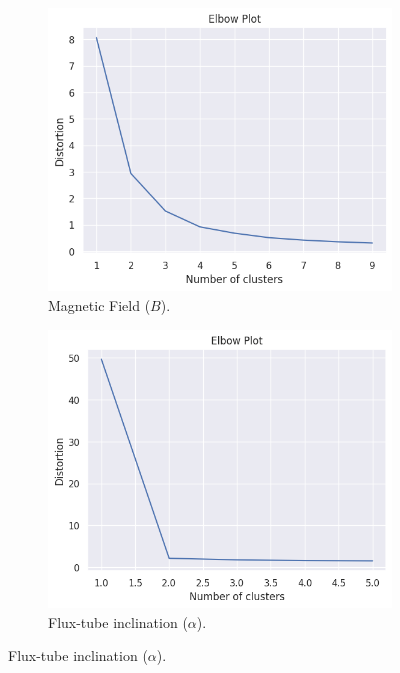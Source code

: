 \begin{figure}[h]
    \caption{TimeSeriesKMeans Elbow Tests}
    \begin{subfigure}[h]{0.48\textwidth}
        \centering
        \includegraphics[width=\textwidth]{figures/tskmeans_elbow_b.png}
        \caption{Magnetic Field ($B$).}
        \label{fig:elbow_b}
    \end{subfigure}
    \hfill
    \begin{subfigure}[h]{0.48\textwidth}
        \centering
        \includegraphics[width=\textwidth]{figures/tskmeans_elbow_alpha.png}
        \caption{Flux-tube inclination ($\alpha$).}
        \label{fig:elbow_alpha}
    \end{subfigure}
\end{figure}

